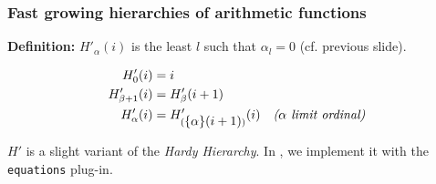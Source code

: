\documentclass[10pt, fleqn]{beamer}
\begin{document}
\begin{frame}
  \frametitle{Fast growing hierarchies of arithmetic functions}




\begin{block}{}
 
  {

    
 \textbf{Definition:} \textcolor{mathcolor}{$H'_\alpha(i)$} is the least $l$ such that \textcolor{mathcolor}{$\alpha_l=0$} (cf. previous slide). 

 
 {\color{mathcolor}
\begin{align}
  H'_0(i) & = i\\
  H'_{\beta+1}(i) &=H'_\beta(i+1) \\
  H'_\alpha(i) &= H'_{(\mbox{$\{\alpha\}(i+1)$})}(i)  \quad\textit{($\alpha$ limit ordinal)} 
\end{align}}}

{$H'$ is a slight variant of the \emph{Hardy Hierarchy}. In \coq, we implement it with the \texttt{equations} plug-in.}


\end{block}
\end{frame}



 

 
\end{document}
